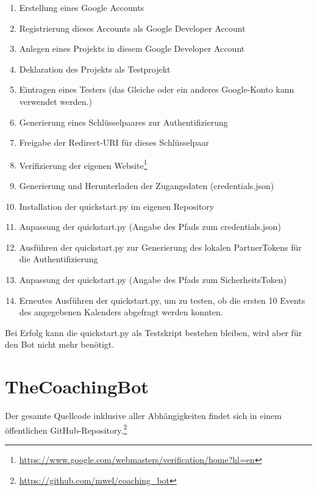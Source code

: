             \begin{enumerate}
                \item Erstellung eines Google Accounts
                \item Registrierung dieses Accounts als Google Developer Account
                \item Anlegen eines Projekts in diesem Google Developer Account
                \item Deklaration des Projekts als Testprojekt
                \item Eintragen eines Testers (das Gleiche oder ein anderes Google-Konto kann verwendet werden.)
                \item Generierung eines Schlüsselpaares zur Authentifizierung
                \item Freigabe der Redirect-URI für dieses Schlüsselpaar
                \item Verifizierung der eigenen Website\footnote{\url{https://www.google.com/webmasters/verification/home?hl=en}}
                \item Generierung und Herunterladen der Zugangsdaten (credentials.json)
                \item Installation der quickstart.py im eigenen Repository
                \item Anpassung der quickstart.py (Angabe des Pfads zum credentials.json)
                \item Ausführen der quickstart.py zur Generierung des lokalen Partner\-Tokens für die Authentifizierung
                \item Anpassung der quickstart.py (Angabe des Pfads zum Sicherheits\-Token)
                \item Erneutes Ausführen der quickstart.py, um zu testen, ob die ersten 10 Events des angegebenen Kalenders abgefragt werden konnten.                    
            \end{enumerate}
        
            Bei Erfolg kann die quickstart.py als Testskript bestehen bleiben, wird aber für den Bot nicht mehr benötigt.
        
    \section{TheCoachingBot}
        Der gesamte Quellcode inklusive aller Abhängigkeiten findet sich in einem öffentlichen GitHub-Repository.\footnote{\url{https://github.com/mwel/coaching_bot}}
        
